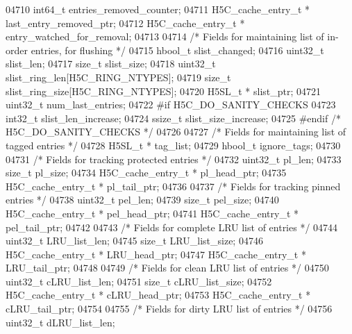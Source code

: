 \begin{DoxyCode}
04710     int64\_t         entries\_removed\_counter;
04711     H5C\_cache\_entry\_t *     last\_entry\_removed\_ptr;
04712     H5C\_cache\_entry\_t *     entry\_watched\_for\_removal;
04713 
04714     \textcolor{comment}{/* Fields for maintaining list of in-order entries, for flushing */}
04715     hbool\_t         slist\_changed;
04716     uint32\_t                    slist\_len;
04717     \textcolor{keywordtype}{size\_t}                      slist\_size;
04718     uint32\_t            slist\_ring\_len[H5C\_RING\_NTYPES];
04719     \textcolor{keywordtype}{size\_t}          slist\_ring\_size[H5C\_RING\_NTYPES];
04720     H5SL\_t *                    slist\_ptr;
04721     uint32\_t                    num\_last\_entries;
04722 \textcolor{preprocessor}{#if H5C\_DO\_SANITY\_CHECKS}
04723     int32\_t         slist\_len\_increase;
04724     ssize\_t         slist\_size\_increase;
04725 \textcolor{preprocessor}{#endif }\textcolor{comment}{/* H5C\_DO\_SANITY\_CHECKS */}\textcolor{preprocessor}{}
04726 
04727     \textcolor{comment}{/* Fields for maintaining list of tagged entries */}
04728     H5SL\_t *                    tag\_list;
04729     hbool\_t                     ignore\_tags;
04730 
04731     \textcolor{comment}{/* Fields for tracking protected entries */}
04732     uint32\_t                    pl\_len;
04733     \textcolor{keywordtype}{size\_t}                      pl\_size;
04734     H5C\_cache\_entry\_t *         pl\_head\_ptr;
04735     H5C\_cache\_entry\_t *     pl\_tail\_ptr;
04736 
04737     \textcolor{comment}{/* Fields for tracking pinned entries */}
04738     uint32\_t                    pel\_len;
04739     \textcolor{keywordtype}{size\_t}                      pel\_size;
04740     H5C\_cache\_entry\_t *         pel\_head\_ptr;
04741     H5C\_cache\_entry\_t *     pel\_tail\_ptr;
04742 
04743     \textcolor{comment}{/* Fields for complete LRU list of entries */}
04744     uint32\_t                    LRU\_list\_len;
04745     \textcolor{keywordtype}{size\_t}                      LRU\_list\_size;
04746     H5C\_cache\_entry\_t *     LRU\_head\_ptr;
04747     H5C\_cache\_entry\_t *     LRU\_tail\_ptr;
04748 
04749     \textcolor{comment}{/* Fields for clean LRU list of entries */}
04750     uint32\_t                    cLRU\_list\_len;
04751     \textcolor{keywordtype}{size\_t}                      cLRU\_list\_size;
04752     H5C\_cache\_entry\_t *     cLRU\_head\_ptr;
04753     H5C\_cache\_entry\_t *     cLRU\_tail\_ptr;
04754 
04755     \textcolor{comment}{/* Fields for dirty LRU list of entries */}
04756     uint32\_t                    dLRU\_list\_len;

\end{DoxyCode}
